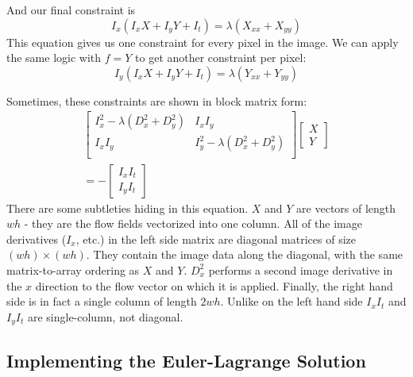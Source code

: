 \documentclass[10pt,twocolumn,letterpaper]{article}
\begin{document}
And our final constraint is
\begin{equation} \label{eq:eulerPlug6}
I_x (I_x X + I_y Y + I_t) = \lambda (X_{xx} + X_{yy})
\end{equation}
This equation gives us one constraint for every pixel in the image.  We can apply the same logic with $f=Y$ to get another constraint per pixel:
\begin{equation} \label{eq:eulerPlug7}
I_y (I_x X + I_y Y + I_t) = \lambda (Y_{xx} + Y_{yy})
\end{equation}

Sometimes, these constraints are shown in block matrix form:
\begin{multline} \label{eq:eulerBlock}
\left[ \begin{array}{cc}
I_x^2 - \lambda (D_x^2 + D_y^2) & I_x I_y\\
I_x I_y & I_y^2 - \lambda (D_x^2 + D_y^2) \\
\end{array} \right]
\left[\begin{array}{c}
X \\
Y
\end{array} \right] \\
=-\left[ \begin{array}{c}
I_x I_t \\
I_y I_t
\end{array} \right]
\end{multline}
There are some subtleties hiding in this equation.  $X$ and $Y$ are vectors of length $wh$ - they are the flow fields vectorized into one column.  All of the image derivatives ($I_x$, etc.) in the left side matrix are diagonal matrices of size $(wh) \times (wh)$.  They contain the image data along the diagonal, with the same matrix-to-array ordering as $X$ and $Y$.  $D_x^2$ performs a second image derivative in the $x$ direction to the flow vector on which it is applied.  Finally, the right hand side is in fact a single column of length $2wh$.  Unlike on the left hand side $I_x I_t$ and $I_y I_t$ are single-column, not diagonal.

\subsection{Implementing the Euler-Lagrange Solution}
\end{document}
